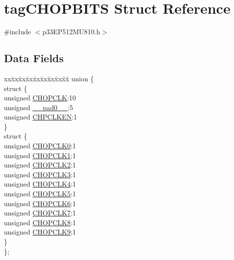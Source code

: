 \hypertarget{structtag_c_h_o_p_b_i_t_s}{}\section{tag\+C\+H\+O\+P\+B\+I\+TS Struct Reference}
\label{structtag_c_h_o_p_b_i_t_s}


{\ttfamily \#include $<$p33\+E\+P512\+M\+U810.\+h$>$}

\subsection*{Data Fields}
\begin{DoxyCompactItemize}
\item 
\begin{tabbing}
xx\=xx\=xx\=xx\=xx\=xx\=xx\=xx\=xx\=\kill
union \{\\
\>struct \{\\
\>\>unsigned \hyperlink{structtag_c_h_o_p_b_i_t_s_a4e4dc544dc49c18ad48c3b08c3a92c25}{CHOPCLK}:10\\
\>\>unsigned \hyperlink{structtag_c_h_o_p_b_i_t_s_adf71f3d8410c1f1dbbc96680a92c49af}{\_\_pad0\_\_}:5\\
\>\>unsigned \hyperlink{structtag_c_h_o_p_b_i_t_s_a1919e8e0ab36ace9ccf7e2509d6a777f}{CHPCLKEN}:1\\
\>\} \\
\>struct \{\\
\>\>unsigned \hyperlink{structtag_c_h_o_p_b_i_t_s_a583589c4c401143b267812b9387f0d8a}{CHOPCLK0}:1\\
\>\>unsigned \hyperlink{structtag_c_h_o_p_b_i_t_s_a8b7b648d2c4c11cab4c61b74257e3561}{CHOPCLK1}:1\\
\>\>unsigned \hyperlink{structtag_c_h_o_p_b_i_t_s_a83e46ba5e2809ba9043977c889f6f0ac}{CHOPCLK2}:1\\
\>\>unsigned \hyperlink{structtag_c_h_o_p_b_i_t_s_a556dec41338076e7d7e8377a8a779d68}{CHOPCLK3}:1\\
\>\>unsigned \hyperlink{structtag_c_h_o_p_b_i_t_s_a7eb446daf4742d38f26338503ed3fec3}{CHOPCLK4}:1\\
\>\>unsigned \hyperlink{structtag_c_h_o_p_b_i_t_s_a473890e1056199ddcf365888e85cccb3}{CHOPCLK5}:1\\
\>\>unsigned \hyperlink{structtag_c_h_o_p_b_i_t_s_a1da1ec8c04d11cabb130a247018b325a}{CHOPCLK6}:1\\
\>\>unsigned \hyperlink{structtag_c_h_o_p_b_i_t_s_a7c191b0d5784f275be87e0143a307cde}{CHOPCLK7}:1\\
\>\>unsigned \hyperlink{structtag_c_h_o_p_b_i_t_s_a125f82bc6cb8514bfd6084f0342da853}{CHOPCLK8}:1\\
\>\>unsigned \hyperlink{structtag_c_h_o_p_b_i_t_s_abe943db6572a5aec64519ca700a0591f}{CHOPCLK9}:1\\
\>\} \\
\}; \\

\end{tabbing}\end{DoxyCompactItemize}


